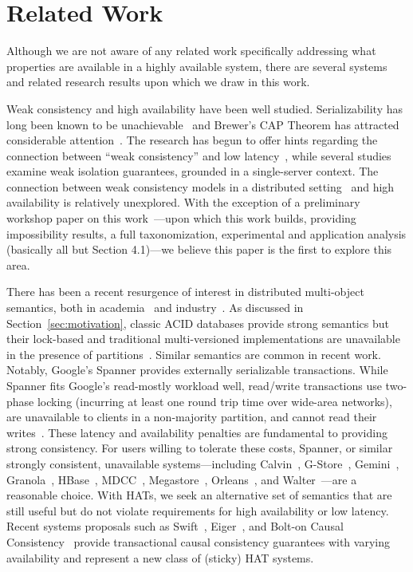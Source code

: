 
\section{Related Work}

Although we are not aware of any related work specifically addressing
what properties are available in a highly available system, there are
several systems and related research results upon which we draw in
this work.

Weak consistency and high availability have been well
studied. Serializability has long been known to be
unachievable~\cite{davidson-survey} and Brewer's CAP Theorem has
attracted considerable attention~\cite{gilbert-cap}. The research has
begun to offer hints regarding the connection between ``weak
consistency'' and low latency~\cite{abadi-pacelc}, while several
studies~\cite{adya, ansicritique} examine weak isolation guarantees,
grounded in a single-server context. The connection between weak
consistency models in a distributed setting~\cite{calm, crdt} and high
availability is relatively unexplored. With the exception of a
preliminary workshop paper on this work~\cite{hat-hotos}---upon which
this work builds, providing impossibility results, a full
taxonomization, experimental and application analysis (basically all
but Section 4.1)---we believe this paper is the first to explore this
area.

There has been a recent resurgence of interest in distributed
multi-object semantics, both in academia~\cite{kraska-s3, granola,
  gstore, mdcc, redblue, cops, eiger, walter,calvin, swift} and
industry~\cite{megastore, orleans, spanner}. As discussed in
Section~\ref{sec:motivation}, classic ACID databases provide strong
semantics but their lock-based and traditional multi-versioned
implementations are unavailable in the presence of
partitions~\cite{bernstein-concurrency, bernstein-book,
  gray-isolation}. Similar semantics are common in recent
work. Notably, Google's Spanner provides externally serializable
transactions. While Spanner fits Google's read-mostly workload well,
read/write transactions use two-phase locking (incurring at least one
round trip time over wide-area networks), are unavailable to clients
in a non-majority partition, and cannot read their
writes~\cite{spanner}. These latency and availability penalties are
fundamental to providing strong consistency. For users willing to
tolerate these costs, Spanner, or similar strongly consistent,
unavailable systems---including Calvin~\cite{calvin},
G-Store~\cite{gstore}, Gemini~\cite{redblue}, Granola~\cite{granola},
HBase~\cite{hbase}, MDCC~\cite{mdcc}, Megastore~\cite{megastore},
Orleans~\cite{orleans}, and Walter~\cite{walter}---are a reasonable
choice. With HATs, we seek an alternative set of semantics that are
still useful but do not violate requirements for high availability or
low latency. Recent systems proposals such as Swift~\cite{swift},
Eiger~\cite{eiger}, and Bolt-on Causal Consistency~\cite{bolton}
provide transactional causal consistency guarantees with varying
availability and represent a new class of (sticky) HAT systems.


